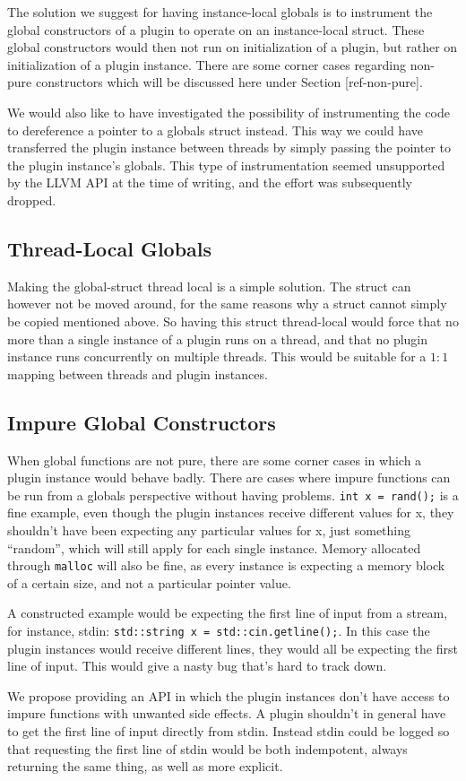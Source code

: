The solution we suggest for having instance-local globals is to instrument the
global constructors of a plugin to operate on an instance-local struct. These
global constructors would then not run on initialization of a plugin, but rather
on initialization of a plugin instance. There are some corner cases regarding
non-pure constructors which will be discussed here under Section [ref-non-pure].

We would also like to have investigated the possibility of instrumenting the
code to dereference a pointer to a globals struct instead. This way we could
have transferred the plugin instance between threads by simply passing the
pointer to the plugin instance's globals. This type of instrumentation seemed
unsupported by the LLVM API at the time of writing, and the effort was
subsequently dropped.

\subsection {Thread-Local Globals}

Making the global-struct thread local is a simple solution. The struct can
however not be moved around, for the same reasons why a struct cannot simply be
copied mentioned above. So having this struct thread-local would force that no
more than a single instance of a plugin runs on a thread, and that no plugin
instance runs concurrently on multiple threads. This would be suitable for a
$1:1$ mapping between threads and plugin instances.

\subsection {Impure Global Constructors}

When global functions are not pure, there are some corner cases in which a
plugin instance would behave badly. There are cases where impure functions can
be run from a globals perspective without having problems.
\texttt{int x = rand();} is a fine example, even though the plugin instances
receive different values for x, they shouldn't have been expecting any
particular values for x, just something ``random'', which will still apply for
each single instance. Memory allocated through \texttt{malloc} will also be
fine, as every instance is expecting a memory block of a certain size, and not
a particular pointer value.

A constructed example would be expecting the first line of input from a stream,
for instance, stdin: \texttt{std::string x = std::cin.getline();}. In this case
the plugin instances would receive different lines, they would all be expecting
the first line of input. This would give a nasty bug that's hard to track down.

We propose providing an API in which the plugin instances don't have access to
impure functions with unwanted side effects. A plugin shouldn't in general have
to get the first line of input directly from stdin. Instead stdin could be
logged so that requesting the first line of stdin would be both indempotent,
always returning the same thing, as well as more explicit.

